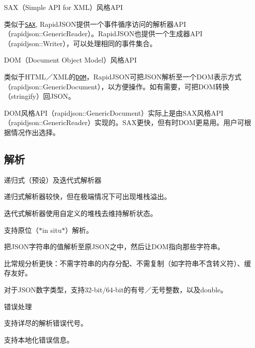 \begin{DoxyItemize}
\item S\+A\+X（\+Simple A\+PI for X\+M\+L）风格\+A\+PI
\begin{DoxyItemize}
\item 类似于\href{http://en.wikipedia.org/wiki/Simple_API_for_XML}{\tt S\+AX}, Rapid\+J\+S\+O\+N提供一个事件循序访问的解析器\+A\+P\+I（{\ttfamily rapidjson\+::\+Generic\+Reader}）。\+Rapid\+J\+S\+O\+N也提供一个生成器\+A\+P\+I（{\ttfamily rapidjson\+::\+Writer}），可以处理相同的事件集合。
\end{DoxyItemize}
\item D\+O\+M（\+Document Object Model）风格\+A\+PI
\begin{DoxyItemize}
\item 类似于\+H\+T\+M\+L／\+X\+M\+L的\href{http://en.wikipedia.org/wiki/Document_Object_Model}{\tt D\+OM}，\+Rapid\+J\+S\+O\+N可把\+J\+S\+O\+N解析至一个\+D\+O\+M表示方式（{\ttfamily rapidjson\+::\+Generic\+Document}），以方便操作。如有需要，可把\+D\+O\+M转换（stringify）回\+J\+S\+O\+N。
\item D\+O\+M风格\+A\+P\+I（{\ttfamily rapidjson\+::\+Generic\+Document}）实际上是由\+S\+A\+X风格\+A\+P\+I（{\ttfamily rapidjson\+::\+Generic\+Reader}）实现的。\+S\+A\+X更快，但有时\+D\+O\+M更易用。用户可根据情况作出选择。
\end{DoxyItemize}
\end{DoxyItemize}

\subsection*{解析}


\begin{DoxyItemize}
\item 递归式（预设）及迭代式解析器
\begin{DoxyItemize}
\item 递归式解析器较快，但在极端情况下可出现堆栈溢出。
\item 迭代式解析器使用自定义的堆栈去维持解析状态。
\end{DoxyItemize}
\item 支持原位（$\ast$in situ$\ast$）解析。
\begin{DoxyItemize}
\item 把\+J\+S\+O\+N字符串的值解析至原\+J\+S\+O\+N之中，然后让\+D\+O\+M指向那些字符串。
\item 比常规分析更快：不需字符串的内存分配、不需复制（如字符串不含转义符）、缓存友好。
\end{DoxyItemize}
\item 对于\+J\+S\+O\+N数字类型，支持32-\/bit/64-\/bit的有号／无号整数，以及{\ttfamily double}。
\item 错误处理
\begin{DoxyItemize}
\item 支持详尽的解析错误代号。
\item 支持本地化错误信息。
\end{DoxyItemize}
\end{DoxyItemize}


